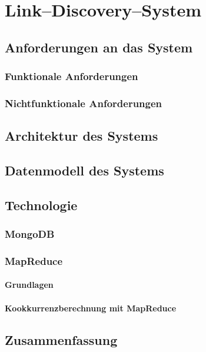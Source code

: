 \chapter{Link--Discovery--System}
\label{system}

\section{Anforderungen an das System}

\subsection{Funktionale Anforderungen}

\subsection{Nichtfunktionale Anforderungen}

\section{Architektur des Systems}

\section{Datenmodell des Systems}

\section{Technologie}

\subsection{MongoDB}

\subsection{MapReduce}

\subsubsection{Grundlagen}

\subsubsection{Kookkurrenzberechnung mit MapReduce}
\label{mapreduce_cooccurence}

\section{Zusammenfassung}